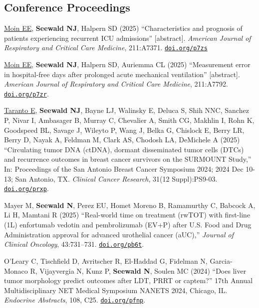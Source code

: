 \documentclass[letterpaper,11pt]{article} %
\begin{document}
 	\subsection*{Conference Proceedings}
     	\begin{etaremune}
            \item \underline{Moin EE}, \textbf{Seewald NJ}, Halpern SD (2025) ``Characteristics and prognosis of patients experiencing recurrent ICU admissions'' [abstract]. \textit{American Journal of Respiratory and Critical Care Medicine}, 211:A7371. \href{https://doi.org/p7zs}{\texttt{doi.org/p7zs}}
        
            \item \underline{Moin EE}, \textbf{Seewald NJ}, Halpern SD, Auriemma CL (2025) ``Measurement error in hospital-free days after prolonged acute mechanical ventilation'' [abstract]. \textit{American Journal of Respiratory and Critical Care Medicine}, 211:A7792. \href{https://doi.org/p7zr}{\texttt{doi.org/p7zr}}.
    
            \item  \underline{Taranto E}, \textbf{Seewald NJ}, Bayne LJ, Walinsky E, Deluca S, Shih NNC, Sanchez P, Nivar I, Ambasager B, Murray C, Chevalier A, Smith CG, Makhlin I, Rohn K, Goodspeed BL, Savage J, Wileyto P, Wang J, Belka G, Chislock E, Berry LR, Berry D, Nayak A, Feldman M, Clark AS, Chodosh LA, DeMichele A (2025) ``Circulating tumor DNA (ctDNA), dormant disseminated tumor cells (DTCs) and recurrence outcomes in breast cancer survivors on the SURMOUNT Study,'' In: Proceedings of the San Antonio Breast Cancer Symposium 2024; 2024 Dec 10-13; San Antonio, TX. \textit{Clinical Cancer Research}, 31(12 Suppl):PS9-03. \href{https://doi.org/prxp}{\texttt{doi.org/prxp}}.
        
            \item Mayer M, \textbf{Seewald N}, Perez EU, Homet Moreno B, Ramamurthy C, Babcock A, Li H, Mamtani R (2025) ``Real-world time on treatment (rwTOT) with first-line (1L) enfortumab vedotin and pembrolizumab (EV+P) after U.S. Food and Drug Administration approval for advanced urothelial cancer (aUC),'' \textit{Journal of Clinical Oncology}, 43:731–731. \href{https://doi.org/pb6t}{\texttt{doi.org/pb6t}}.

            \item O'Leary C, Tischfield D, Avritscher R, El-Haddad G, Fidelman N, Garcia-Monaco R, Vijayvergia N, Kunz P, \textbf{Seewald N}, Soulen MC (2024) ``Does liver tumor morphology predict outcomes after LDT, PRRT or captem?'' 17th Annual Multidisciplinary NET Medical Symposium NANETS 2024, Chicago, IL. \textit{Endocrine Abstracts}, 108, C25. \href{https://doi.org/pfnp}{\texttt{doi.org/pfnp}}.
    

\end{etaremune}
\end{document}
